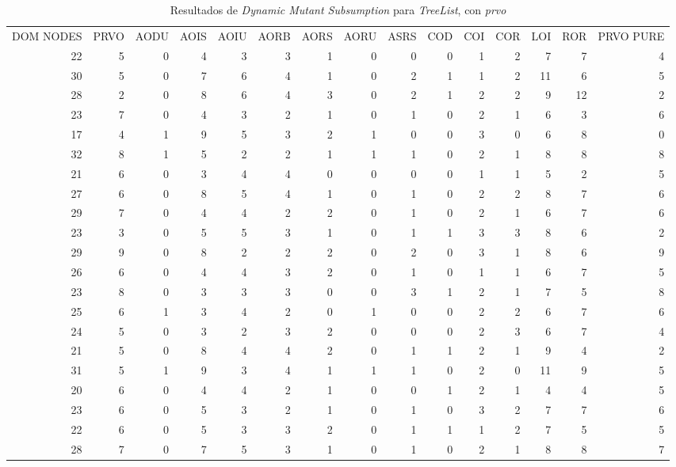 \begin{table}[]
	\caption{Resultados de \emph{Dynamic Mutant Subsumption} para \emph{TreeList}, con \emph{prvo}}
	\label{tables.results.subsumption.treelist.prvo}
	\centering
	\scriptsize
	\def\arraystretch{0.95}
	\setlength\tabcolsep{0.5mm}
	\begin{tabular}{rrrrrrrrrrrrrrr}
		DOM NODES & PRVO & AODU & AOIS & AOIU & AORB & AORS & AORU & ASRS & COD & COI & COR & LOI & ROR & PRVO PURE \\
		22 & 5 & 0 & 4 & 3 & 3 & 1 & 0 & 0 & 0 & 1 & 2 & 7 & 7 & 4 \\
		30 & 5 & 0 & 7 & 6 & 4 & 1 & 0 & 2 & 1 & 1 & 2 & 11 & 6 & 5 \\
		28 & 2 & 0 & 8 & 6 & 4 & 3 & 0 & 2 & 1 & 2 & 2 & 9 & 12 & 2 \\
		23 & 7 & 0 & 4 & 3 & 2 & 1 & 0 & 1 & 0 & 2 & 1 & 6 & 3 & 6 \\
		17 & 4 & 1 & 9 & 5 & 3 & 2 & 1 & 0 & 0 & 3 & 0 & 6 & 8 & 0 \\
		32 & 8 & 1 & 5 & 2 & 2 & 1 & 1 & 1 & 0 & 2 & 1 & 8 & 8 & 8 \\
		21 & 6 & 0 & 3 & 4 & 4 & 0 & 0 & 0 & 0 & 1 & 1 & 5 & 2 & 5 \\
		27 & 6 & 0 & 8 & 5 & 4 & 1 & 0 & 1 & 0 & 2 & 2 & 8 & 7 & 6 \\
		29 & 7 & 0 & 4 & 4 & 2 & 2 & 0 & 1 & 0 & 2 & 1 & 6 & 7 & 6 \\
		23 & 3 & 0 & 5 & 5 & 3 & 1 & 0 & 1 & 1 & 3 & 3 & 8 & 6 & 2 \\
		29 & 9 & 0 & 8 & 2 & 2 & 2 & 0 & 2 & 0 & 3 & 1 & 8 & 6 & 9 \\
		26 & 6 & 0 & 4 & 4 & 3 & 2 & 0 & 1 & 0 & 1 & 1 & 6 & 7 & 5 \\
		23 & 8 & 0 & 3 & 3 & 3 & 0 & 0 & 3 & 1 & 2 & 1 & 7 & 5 & 8 \\
		25 & 6 & 1 & 3 & 4 & 2 & 0 & 1 & 0 & 0 & 2 & 2 & 6 & 7 & 6 \\
		24 & 5 & 0 & 3 & 2 & 3 & 2 & 0 & 0 & 0 & 2 & 3 & 6 & 7 & 4 \\
		21 & 5 & 0 & 8 & 4 & 4 & 2 & 0 & 1 & 1 & 2 & 1 & 9 & 4 & 2 \\
		31 & 5 & 1 & 9 & 3 & 4 & 1 & 1 & 1 & 0 & 2 & 0 & 11 & 9 & 5 \\
		20 & 6 & 0 & 4 & 4 & 2 & 1 & 0 & 0 & 1 & 2 & 1 & 4 & 4 & 5 \\
		23 & 6 & 0 & 5 & 3 & 2 & 1 & 0 & 1 & 0 & 3 & 2 & 7 & 7 & 6 \\
		22 & 6 & 0 & 5 & 3 & 3 & 2 & 0 & 1 & 1 & 1 & 2 & 7 & 5 & 5 \\
		28 & 7 & 0 & 7 & 5 & 3 & 1 & 0 & 1 & 0 & 2 & 1 & 8 & 8 & 7 \\

\end{tabular}
\end{table}
